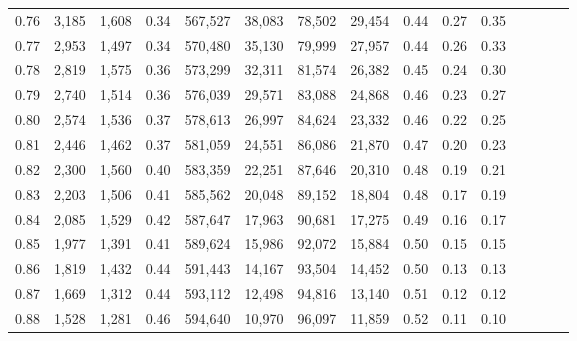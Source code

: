 \begin{tabular}{rrrcrrrrrrrrrrr}
0.76 &   3,185 &  1,608 &                                       0.34 &  567,527 &   38,083 &   78,502 &   29,454 &  0.44 &  0.27 &                         0.35 \\
0.77 &   2,953 &  1,497 &                                       0.34 &  570,480 &   35,130 &   79,999 &   27,957 &  0.44 &  0.26 &                         0.33 \\
0.78 &   2,819 &  1,575 &                                       0.36 &  573,299 &   32,311 &   81,574 &   26,382 &  0.45 &  0.24 &                         0.30 \\
0.79 &   2,740 &  1,514 &                                       0.36 &  576,039 &   29,571 &   83,088 &   24,868 &  0.46 &  0.23 &                         0.27 \\
0.80 &   2,574 &  1,536 &                                       0.37 &  578,613 &   26,997 &   84,624 &   23,332 &  0.46 &  0.22 &                         0.25 \\
0.81 &   2,446 &  1,462 &                                       0.37 &  581,059 &   24,551 &   86,086 &   21,870 &  0.47 &  0.20 &                         0.23 \\
0.82 &   2,300 &  1,560 &                                       0.40 &  583,359 &   22,251 &   87,646 &   20,310 &  0.48 &  0.19 &                         0.21 \\
0.83 &   2,203 &  1,506 &                                       0.41 &  585,562 &   20,048 &   89,152 &   18,804 &  0.48 &  0.17 &                         0.19 \\
0.84 &   2,085 &  1,529 &                                       0.42 &  587,647 &   17,963 &   90,681 &   17,275 &  0.49 &  0.16 &                         0.17 \\
0.85 &   1,977 &  1,391 &                                       0.41 &  589,624 &   15,986 &   92,072 &   15,884 &  0.50 &  0.15 &                         0.15 \\
0.86 &   1,819 &  1,432 &                                       0.44 &  591,443 &   14,167 &   93,504 &   14,452 &  0.50 &  0.13 &                         0.13 \\
0.87 &   1,669 &  1,312 &                                       0.44 &  593,112 &   12,498 &   94,816 &   13,140 &  0.51 &  0.12 &                         0.12 \\
0.88 &   1,528 &  1,281 &                                       0.46 &  594,640 &   10,970 &   96,097 &   11,859 &  0.52 &  0.11 &                         0.10 \\

\end{tabular}

